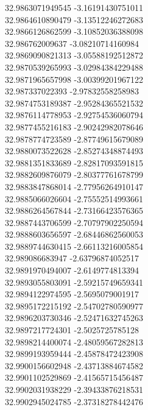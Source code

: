 {32.9863071949545	-3.16191430751011\\
32.9864610890479	-3.13512246272683\\
32.9866126862599	-3.10852036388098\\
32.986762009637	-3.08210714160984\\
32.9869090821313	-3.05588192512872\\
32.9870539265993	-3.02984384229488\\
32.9871965657998	-3.00399201967122\\
32.987337022393	-2.97832558258983\\
32.9874753189387	-2.95284365521532\\
32.9876114778953	-2.92754536060794\\
32.9877455216183	-2.90242982078646\\
32.9878774723589	-2.87749615679089\\
32.9880073522628	-2.85274348874493\\
32.9881351833689	-2.82817093591815\\
32.9882609876079	-2.80377761678799\\
32.9883847868014	-2.77956264910147\\
32.9885066026604	-2.75552514993661\\
32.9886264567844	-2.73166423576365\\
32.9887443706599	-2.70797902250594\\
32.9888603656597	-2.68446862560053\\
32.9889744630415	-2.66113216005854\\
32.989086683947	-2.63796874052517\\
32.9891970494007	-2.6149774813394\\
32.9893055803091	-2.59215749659341\\
32.9894122974595	-2.5695079001917\\
32.9895172215192	-2.54702780590977\\
32.9896203730346	-2.52471632745263\\
32.9897217724301	-2.5025725785128\\
32.9898214400074	-2.48059567282813\\
32.9899193959444	-2.45878472423908\\
32.9900156602948	-2.43713884674582\\
32.9901102529869	-2.41565715456487\\
32.9902031938229	-2.39433876218531\\
32.9902945024785	-2.37318278442476\\
}
